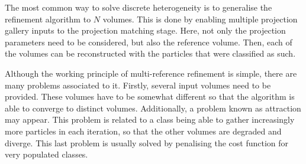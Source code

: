 \documentclass[../main.tex]{subfiles}
\begin{document}
The most common way to solve discrete heterogeneity is to generalise the refinement algorithm to $N$ volumes. This is done by enabling multiple projection gallery inputs to the projection matching stage. Here, not only the projection parameters need to be considered, but also the reference volume. Then, each of the volumes can be reconstructed with the particles that were classified as such.

Although the working principle of multi-reference refinement is simple, there are many problems associated to it. Firstly, several input volumes need to be provided. These volumes have to be somewhat different so that the algorithm is able to converge to distinct volumes. Additionally, a problem known as attraction may appear. This problem is related to a class being able to gather increasingly more particles in each iteration, so that the other volumes are degraded and diverge. This last problem is usually solved by penalising the cost function for very populated classes.
\end{document}

